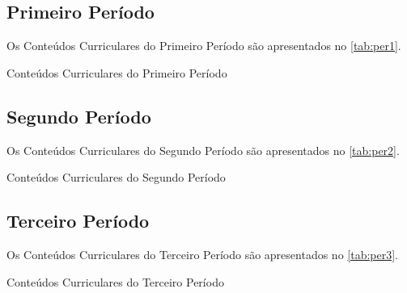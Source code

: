 \subsection{Primeiro Período}

Os Conteúdos Curriculares do Primeiro Período são apresentados no \autoref{tab:per1}.

\begin{table}[htb!]
	\centering\tiny
	\caption{Conteúdos Curriculares do Primeiro Período}
	
	\label{tab:per1}
\end{table}

\subsection{Segundo Período}

Os Conteúdos Curriculares do Segundo Período são apresentados no \autoref{tab:per2}.

\begin{table}[htb!]
	\centering\tiny
	\caption{Conteúdos Curriculares do Segundo Período}
	
	\label{tab:per2}
\end{table}

\subsection{Terceiro Período}

Os Conteúdos Curriculares do Terceiro Período são apresentados no \autoref{tab:per3}.

\begin{table}[htb!]
	\centering\tiny
	\caption{Conteúdos Curriculares do Terceiro Período}
	
	\label{tab:per3}
\end{table}



